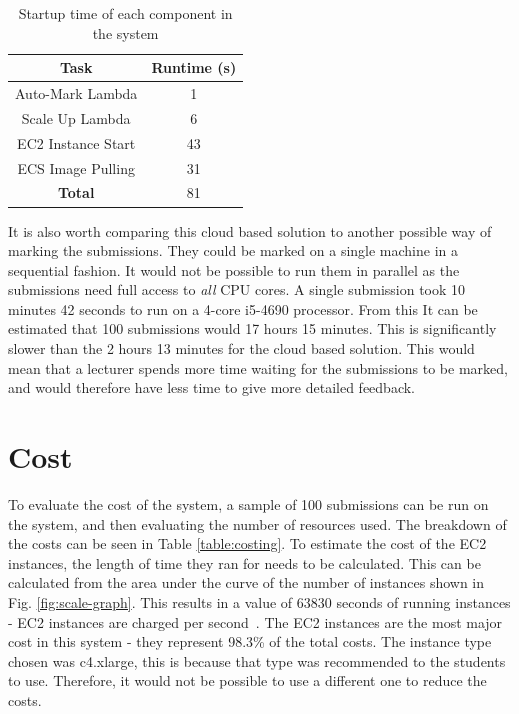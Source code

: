 \documentclass[runningheads]{llncs}
\begin{document}
\begin{table}
\vspace{-1em}
\caption{Startup time of each component in the system}\label{tab1}
\centering
\begin{tabular}{|c|c|}
\hline
\textbf{Task} & \textbf{Runtime (s)} \\
\hline
Auto-Mark Lambda & 1 \\
Scale Up Lambda & 6 \\
EC2 Instance Start & 43 \\
ECS Image Pulling & 31 \\
\hline
\textbf{Total} & 81 \\
\hline
\end{tabular}
\label{table:startup-time}
\vspace{-1em}
\end{table}

It is also worth comparing this cloud based solution to another possible way of marking the submissions. They could be marked on a single machine in a sequential fashion. It would not be possible to run them in parallel as the submissions need full access to \emph{all} CPU cores. A single submission took 10 minutes 42 seconds to run on a 4-core i5-4690 processor. From this It can be estimated that 100 submissions would 17 hours 15 minutes. This is significantly slower than the 2 hours 13 minutes for the cloud based solution. This would mean that a lecturer spends more time waiting for the submissions to be marked, and would therefore have less time to give more detailed feedback.

\section{Cost}
To evaluate the cost of the system, a sample of 100 submissions can be run on the system, and then evaluating the number of resources used. The breakdown of the costs can be seen in Table \ref{table:costing}. To estimate the cost of the EC2 instances, the length of time they ran for needs to be calculated. This can be calculated from the area under the curve of the number of instances shown in Fig. \ref{fig:scale-graph}. This results in a value of 63830 seconds of running instances - EC2 instances are charged per second~\cite{ec2-per-second}. The EC2 instances are the most major cost in this system - they represent 98.3\% of the total costs. The instance type chosen was c4.xlarge, this is because that type was recommended to the students to use. Therefore, it would not be possible to use a different one to reduce the costs.
\end{document}
